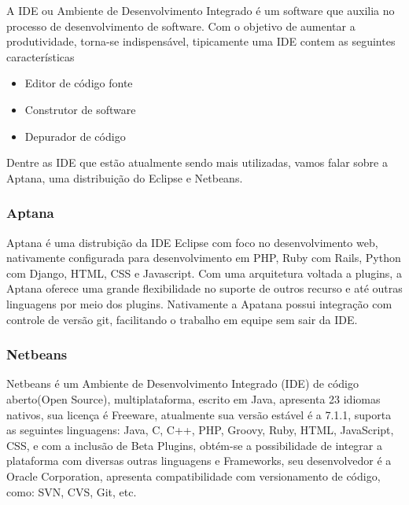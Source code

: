 \documentclass[12pt,a4paper]{article}
\begin{document}
				A IDE ou Ambiente de Desenvolvimento Integrado é um software que auxilia no
				processo de desenvolvimento de software. Com o objetivo de aumentar a
				produtividade, torna-se indispensável, tipicamente uma IDE contem as
				seguintes características
				\begin{itemize}
					\item Editor de código fonte
					\item Construtor de software
					\item Depurador de código
				\end{itemize}
				
				Dentre as IDE que estão atualmente sendo mais utilizadas, vamos falar sobre
				a Aptana, uma distribuição do Eclipse e Netbeans.
		
		\subsubsection{Aptana}
			Aptana é uma distrubição da IDE Eclipse com foco no desenvolvimento web, nativamente configurada para
			desenvolvimento em PHP, Ruby com Rails, Python com Django, HTML, CSS e Javascript. Com uma arquitetura voltada a
			plugins, a Aptana oferece uma grande flexibilidade no suporte de outros recurso e até outras linguagens por meio dos
			plugins. Nativamente a Apatana possui integração com controle de versão git, facilitando o trabalho em equipe sem
			sair da IDE.
		
		\subsubsection{Netbeans}
			Netbeans é um Ambiente de Desenvolvimento Integrado (IDE) de código aberto(Open Source), multiplataforma, escrito em
			Java, apresenta 23 idiomas nativos, sua licença é Freeware, atualmente sua versão estável é a 7.1.1, suporta as
			seguintes linguagens: Java, C, C++, PHP, Groovy, Ruby, HTML, JavaScript, CSS, e com a inclusão de Beta Plugins,
			obtém-se a possibilidade de integrar a plataforma com diversas outras linguagens e Frameworks, seu desenvolvedor é a
			Oracle Corporation, apresenta compatibilidade com versionamento de código, como: SVN, CVS, Git, etc.
		
\end{document}
